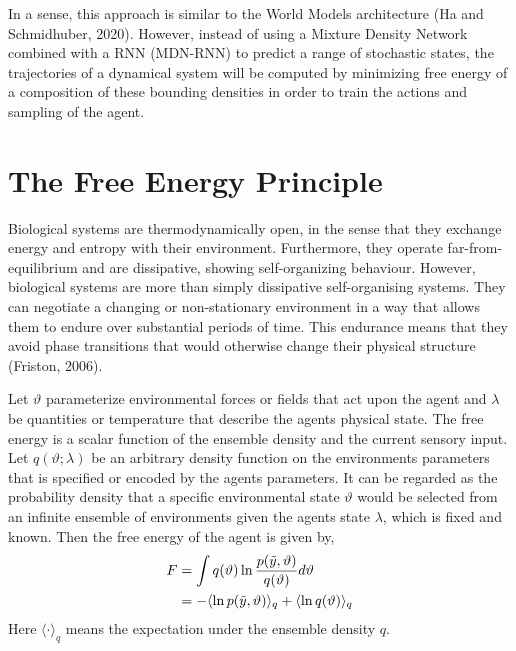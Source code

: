 \documentclass{article}
\begin{document}
In a sense, this approach is similar to the World Models architecture (Ha and Schmidhuber, 2020). However, instead of using a Mixture Density Network combined with a RNN (MDN-RNN) to predict a range of stochastic states, the trajectories of a dynamical system will be computed by minimizing free energy of a composition of these bounding densities in order to train the actions and sampling of the agent. 

\section{The Free Energy Principle}

Biological systems are thermodynamically open, in the sense that they exchange energy and entropy with their environment. Furthermore, they operate far-from-equilibrium and are dissipative, showing self-organizing behaviour. However, biological systems are more than simply dissipative self-organising systems. They can negotiate a changing or non-stationary environment in a way that allows them to endure over substantial periods of time. This endurance means that they avoid phase transitions that would otherwise change their physical structure (Friston, 2006).

Let $\vartheta$ parameterize environmental forces or fields that act upon the agent and $\lambda$ be quantities or temperature that describe the agents physical state. The free energy is a scalar function of the ensemble density and the current sensory input. Let $q(\vartheta ;\lambda)$ be an arbitrary density function on the environments parameters that is specified or encoded by the agents parameters. It can be regarded as the probability density that a specific environmental state $\vartheta$ would be selected from an infinite ensemble of environments given the agents state $\lambda$, which is fixed and known. Then the free energy of the agent is given by, 
\begin{align}\label{eq:free-energy-1}
\begin{split} 
    F &= \int q(\vartheta) \ln \frac{p(\Tilde{y},\vartheta)}{q(\vartheta)} d\vartheta \\
    &= - \langle \ln p(\Tilde{y},\vartheta) \rangle_q + \langle \ln q(\vartheta) \rangle_q
\end{split}
\end{align}
Here $\langle \cdot \rangle_q$ means the expectation under the ensemble density $q$.

\end{document}
